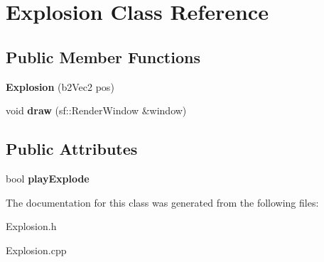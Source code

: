 \hypertarget{class_explosion}{}\section{Explosion Class Reference}
\label{class_explosion}
\subsection*{Public Member Functions}
\begin{DoxyCompactItemize}
\item 
{\bfseries Explosion} (b2\+Vec2 pos)\hypertarget{class_explosion_a36467356c8fac49bdbdfa583f20c16a8}{}\label{class_explosion_a36467356c8fac49bdbdfa583f20c16a8}

\item 
void {\bfseries draw} (sf\+::\+Render\+Window \&window)\hypertarget{class_explosion_a5274942d8fd26d78c2c270dae7ae607d}{}\label{class_explosion_a5274942d8fd26d78c2c270dae7ae607d}

\end{DoxyCompactItemize}
\subsection*{Public Attributes}
\begin{DoxyCompactItemize}
\item 
bool {\bfseries play\+Explode}\hypertarget{class_explosion_a4637494d978aae5ce60aa0513a45aa6a}{}\label{class_explosion_a4637494d978aae5ce60aa0513a45aa6a}

\end{DoxyCompactItemize}


The documentation for this class was generated from the following files\+:\begin{DoxyCompactItemize}
\item 
Explosion.\+h\item 
Explosion.\+cpp\end{DoxyCompactItemize}

